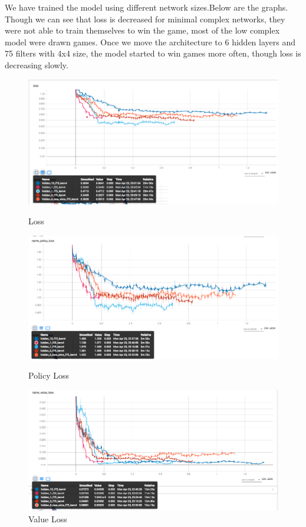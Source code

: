 \documentclass{article}
\begin{document}
We have trained the model using different network sizes.Below are the graphs. Though we can see that loss is decreased for minimal complex networks, they were not able to train themselves to win the game, most of the low complex model were drawn games. Once we move the architecture to 6 hidden layers and 75 filters with 4x4 size, the model started to win games more often, though loss is decreasing slowly.

    \begin{figure}[!htb]
        \centering
            \includegraphics[width=\linewidth]{loss.png}
            \caption{Loss}
        \endminipage\hfill
            \includegraphics[width=\linewidth]{name_policy_loss.png}
            \caption{Policy Loss}
        \endminipage\hfill
            \includegraphics[width=\linewidth]{name_value_loss.png}
            \caption{Value Loss}
        \endminipage\hfill
    \end{figure}
\end{document}
